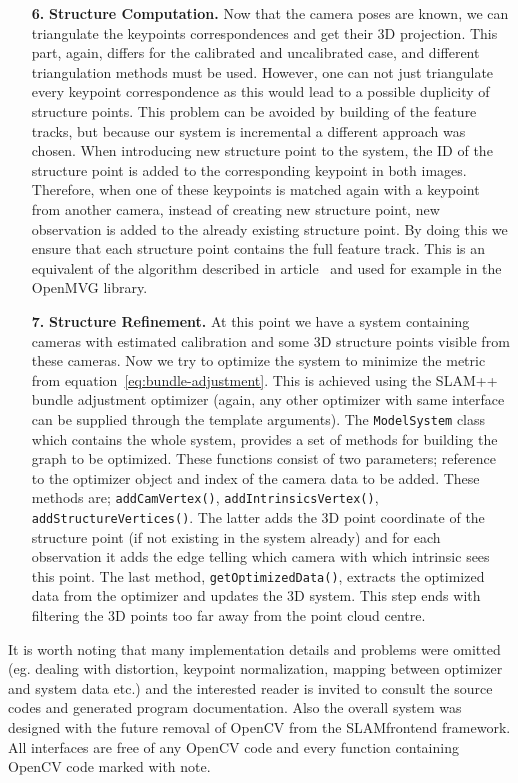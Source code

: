 \begin{itemize}
\item[\textbf{6.}] \textbf{Structure Computation.}
Now that the camera poses are known, we can triangulate the keypoints correspondences and get their 3D projection. This part, again, differs for the calibrated and uncalibrated case, and different triangulation methods must be used. However, one can not just triangulate every keypoint correspondence as this would lead to a possible duplicity of structure points. This problem can be avoided by building of the feature tracks, but because our system is incremental a different approach was chosen. When introducing new structure point to the system, the ID of the structure point is added to the corresponding keypoint in both images. Therefore, when one of these keypoints is matched again with a keypoint from another camera, instead of creating new structure point, new observation is added to the already existing structure point. By doing this we ensure that each structure point contains the full feature track. This is an equivalent of the algorithm described in article~\cite{feature-tracking} and used for example in the OpenMVG library.

\item[\textbf{7.}]  \textbf{Structure Refinement.} At this point we have a system containing cameras with estimated calibration and some 3D structure points visible from these cameras. Now we try to optimize the system to minimize the metric from equation~\ref{eq:bundle-adjustment}. This is achieved using the SLAM++ bundle adjustment optimizer (again, any other optimizer with same interface can be supplied through the template arguments). The \texttt{ModelSystem} class which contains the whole system, provides a set of methods for building the graph to be optimized. These functions consist of two parameters; reference to the optimizer object and index of the camera data to be added. These methods are; \texttt{addCamVertex()}, \texttt{addIntrinsicsVertex()}, \texttt{addStructureVertices()}. The latter adds the 3D point coordinate of the structure point (if not existing in the system already) and for each observation it adds the edge telling which camera with which intrinsic sees this point. The last method, \texttt{getOptimizedData()}, extracts the optimized data from the optimizer and updates the 3D system. This step ends with filtering the 3D points too far away from the point cloud centre.

\end{itemize}
It is worth noting that many implementation details and problems were omitted (eg. dealing with distortion, keypoint normalization, mapping between optimizer and system data etc.) and the interested reader is invited to consult the source codes and generated program documentation. Also the overall system was designed with the future removal of OpenCV from the SLAM\textunderscore frontend framework. All interfaces are free of any OpenCV code and every function containing OpenCV code marked with note.

